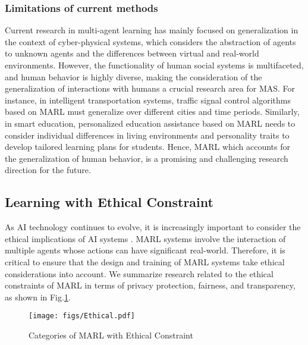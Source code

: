 \documentclass[acmsmall]{acmart}
\begin{document}
\subsubsection{Limitations of current methods}
Current research in multi-agent learning has mainly focused on generalization in the context of cyber-physical systems, which considers the abstraction of agents to unknown agents and the differences between virtual and real-world environments. However, the functionality of human social systems is multifaceted, and human behavior is highly diverse, making the consideration of the generalization of interactions with humans a crucial research area for MAS. For instance, in intelligent transportation systems, traffic signal control algorithms based on MARL must generalize over different cities and time periods. Similarly, in smart education, personalized education assistance based on MARL needs to consider individual differences in living environments and personality traits to develop tailored learning plans for students. Hence, MARL which accounts for the generalization of human behavior, is a promising and challenging research direction for the future.
\subsection{Learning with Ethical Constraint}
As AI technology continues to evolve, it is increasingly important to consider the ethical implications of AI systems \cite{ASHOK2022102433}. MARL systems involve the interaction of multiple agents whose actions can have significant real-world. Therefore, it is critical to ensure that the design and training of MARL systems take ethical considerations into account. We summarize research related to the ethical constraints of MARL in terms of privacy protection, fairness, and transparency, as shown in Fig.\ref{ethical}.
\begin{figure}
    \centering
    \texttt{[image: figs/Ethical.pdf]}
    \caption{Categories of MARL with Ethical Constraint}
    \label{ethical}
\end{figure}
\end{document}
